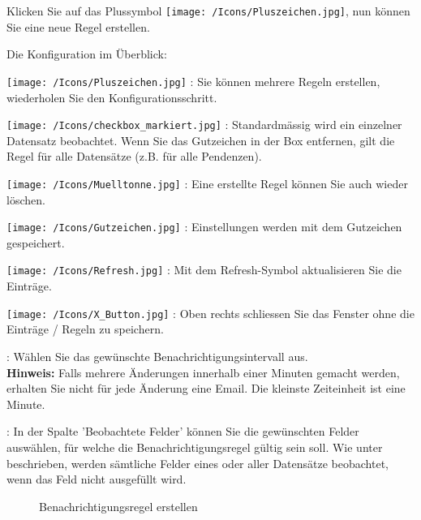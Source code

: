 Klicken Sie auf das Plussymbol \texttt{[image: /Icons/Pluszeichen.jpg]}, nun können Sie eine neue Regel erstellen.

Die Konfiguration im Überblick:

\begin{compactitem}
	\item \texttt{[image: /Icons/Pluszeichen.jpg]} : Sie können mehrere Regeln erstellen, wiederholen Sie den Konfigurationsschritt.
	\item \texttt{[image: /Icons/checkbox\_markiert.jpg]} : Standardmässig wird ein einzelner Datensatz beobachtet. Wenn Sie das Gutzeichen in der Box entfernen, gilt die Regel für alle Datensätze (z.B. für alle Pendenzen).
	\item \texttt{[image: /Icons/Muelltonne.jpg]} : Eine erstellte Regel können Sie auch wieder löschen.
	\item \texttt{[image: /Icons/Gutzeichen.jpg]} : Einstellungen werden mit dem Gutzeichen gespeichert.
	\item \texttt{[image: /Icons/Refresh.jpg]} : Mit dem Refresh-Symbol aktualisieren Sie die Einträge.
	\item \texttt{[image: /Icons/X\_Button.jpg]} : Oben rechts schliessen Sie das Fenster ohne die Einträge / Regeln zu speichern.
	\item {}: Wählen Sie das gewünschte Benachrichtigungsintervall aus.\\
	\textbf{Hinweis:} Falls mehrere Änderungen innerhalb einer Minuten gemacht werden, erhalten Sie nicht für jede Änderung eine Email. Die kleinste Zeiteinheit ist eine Minute.
	\item {}: In der Spalte 'Beobachtete Felder' können Sie die gewünschten Felder auswählen, für welche die Benachrichtigungsregel gültig sein soll. Wie unter  beschrieben, werden sämtliche Felder eines oder aller Datensätze beobachtet, wenn das Feld nicht ausgefüllt wird.
\end{compactitem}

\begin{figure}[H]
\caption{Benachrichtigungsregel erstellen}
\end{figure}

